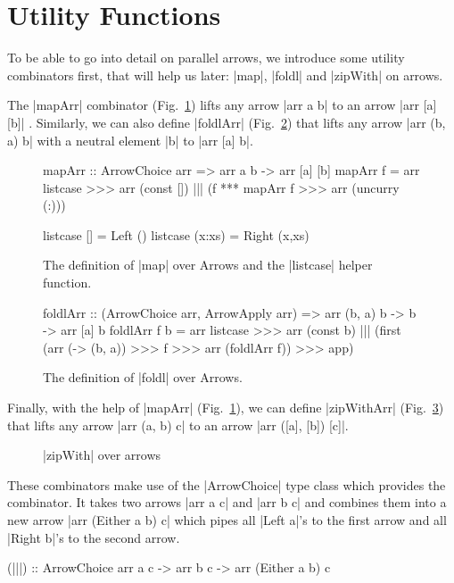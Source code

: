 \section{Utility Functions}\label{utilfns}
To be able to go into detail on parallel arrows, we introduce some utility combinators first, that will help us later: |map|, |foldl| and |zipWith| on arrows.

The |mapArr| combinator (Fig.~\ref{fig:mapArr}) lifts any arrow |arr a
b| to an arrow |arr [a] [b]| \cite{programming_with_arrows}. 
Similarly, we can also define |foldlArr| (Fig.~\ref{fig:foldlArr}) that lifts any arrow |arr (b, a) b| with a neutral element |b| to |arr [a] b|.

\begin{figure}[htb]
\begin{code}
mapArr :: ArrowChoice arr => arr a b -> arr [a] [b]
mapArr f =
	arr listcase >>>
	arr (const []) ||| (f *** mapArr f >>> arr (uncurry (:)))

listcase [] = Left ()
listcase (x:xs) = Right (x,xs)
\end{code}
\caption{The definition of |map| over Arrows and the |listcase| helper
function.}
\label{fig:mapArr}
\end{figure}
\begin{figure}[htb]
\begin{code}
foldlArr :: (ArrowChoice arr, ArrowApply arr) => arr (b, a) b -> b -> arr [a] b
foldlArr f b =
	arr listcase >>>
	arr (const b) |||
		(first (arr (\a -> (b, a)) >>> f >>> arr (foldlArr f)) >>> app)
\end{code}
\caption{The definition of |foldl| over Arrows.}
\label{fig:foldlArr}
\end{figure}

Finally, with the help of |mapArr| (Fig.~\ref{fig:mapArr}), we can define |zipWithArr|  (Fig.~\ref{fig:zipWithArr}) that lifts any arrow |arr (a, b) c| to an arrow |arr ([a], [b]) [c]|.
\begin{figure}[h]
\caption{|zipWith| over arrows}
\label{fig:zipWithArr}
\end{figure}

These combinators make use of the |ArrowChoice| type class which provides the \pipepipepipe combinator. It takes two arrows |arr a c| and |arr b c| and combines them into a new arrow |arr (Either a b) c| which pipes all |Left a|'s to the first arrow and all |Right b|'s to the second arrow.
\begin{code}
(|||) :: ArrowChoice arr a c -> arr b c -> arr (Either a b) c
\end{code}

